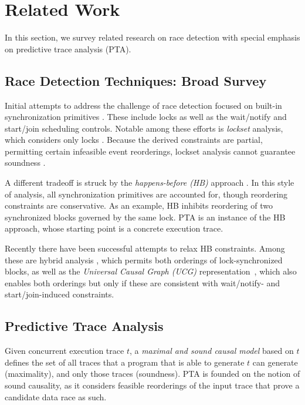 \section{Related Work}

In this section, we survey related research on race detection with special emphasis on predictive trace analysis (PTA).

\subsection{Race Detection Techniques: Broad Survey} 

Initial attempts to address the challenge of race detection focused on built-in synchronization primitives \cite{XXX,YYY}. These include locks as well as the wait/notify and start/join scheduling controls. Notable among these efforts is \emph{lockset} analysis, which considers only locks \cite{XXX}. Because the derived constraints are partial, permitting certain infeasible event reorderings, lockset analysis cannot guarantee soundness \cite{Huang}. 

A different tradeoff is struck by the \emph{happens-before (HB)} approach \cite{Lamport}. In this style of analysis, all synchronization primitives are accounted for, though reordering constraints are conservative. As an example, HB inhibits reordering of two synchronized blocks governed by the same lock. PTA is an instance  of the HB approach, whose starting point is a concrete execution trace.

Recently there have been successful attempts to relax HB constraints. Among these are hybrid analysis \cite{XXX}, which permits both orderings of lock-synchronized blocks, as well as the \emph{Universal Causal Graph (UCG)} representation~\cite{ucg}, which also enables both orderings but only if these are consistent with wait/notify- and start/join-induced constraints.

\subsection{Predictive Trace Analysis}

Given concurrent execution trace $t$, a \emph{maximal and sound causal model} based on $t$ defines the set of all traces that a program that is able to generate $t$ can generate (maximality), and only those traces (soundness). PTA is founded on the notion of sound causality, as it considers feasible reorderings of the input trace that prove a candidate data race as such. 

